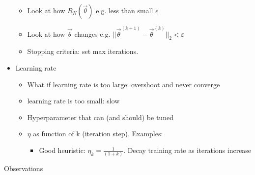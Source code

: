 \documentclass[10pt, oneside]{article}
\begin{document}
\begin{itemize}
\begin{itemize}
        \item Look at how $R_N(\vec \theta)$ e.g. less than small $\epsilon$
        \item Look at how $\vec \theta$ changes e.g. $||\vec \theta^{(k+1)} -\vec \theta ^{(k)}||_2 < \varepsilon$ 
        \item Stopping criteria: set max iterations.
    \end{itemize}
    \item Learning rate
    \begin{itemize}
        \item What if learning rate is too large: overshoot and never converge
        \item learning rate is too small: slow
        \item Hyperparameter that can (and should) be tuned
        \item $\eta$ as function of k (iteration step). Examples:
        \begin{itemize}
            \item Good heuristic: $\eta_k=\frac{1}{(1+k)}$. Decay training rate as iterations increase
        \end{itemize}
    \end{itemize}
\end{itemize}
Observations
\end{document}
